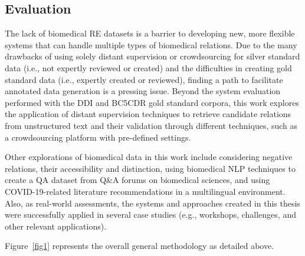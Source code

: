 \subsection{Evaluation}

 The lack of biomedical RE datasets is a barrier to developing new, more flexible systems that can handle multiple types of biomedical relations. Due to the many drawbacks of using solely distant supervision or crowdsourcing for silver standard data (i.e., not expertly reviewed or created) and the difficulties in creating gold standard data (i.e., expertly created or reviewed), finding a path to facilitate annotated data generation is a pressing issue. Beyond the system evaluation performed with the DDI and BC5CDR gold standard corpora, this work explores the application of distant supervision techniques to retrieve candidate relations from unstructured text and their validation through different techniques, such as a crowdsourcing platform with pre-defined settings. 

Other explorations of biomedical data in this work include considering negative relations, their accessibility and distinction, using biomedical NLP techniques to create a QA dataset from Q\&A forums on biomedical sciences, and using COVID-19-related literature recommendations in a multilingual environment. Also, as real-world assessments, the systems and approaches created in this thesis were successfully applied in several case studies (e.g., workshops, challenges, and other relevant applications).


Figure~\ref{fig1} represents the overall general methodology as detailed above.

